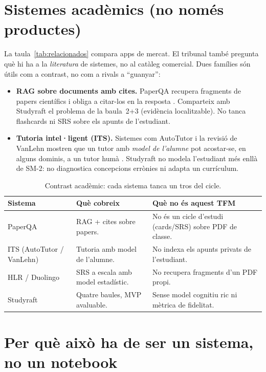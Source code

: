 \section{Sistemes acadèmics (no només productes)}

La taula~\ref{tab:relacionados} compara apps de mercat. El tribunal també pregunta què hi ha a la \emph{literatura} de sistemes, no al catàleg comercial. Dues famílies són útils com a contrast, no com a rivals a ``guanyar'':

\begin{itemize}
  \item \textbf{RAG sobre documents amb cites.} PaperQA recupera fragments de papers científics i obliga a citar-los en la resposta \parencite{lala2023paperqa}. Comparteix amb Studyraft el problema de la baula~2+3 (evidència localitzable). No tanca flashcards ni SRS sobre els apunts de l'estudiant.
  \item \textbf{Tutoria intel·ligent (ITS).} Sistemes com AutoTutor i la revisió de VanLehn mostren que un tutor amb \emph{model de l'alumne} pot acostar-se, en alguns dominis, a un tutor humà \parencite{graesser2005autotutor,vanlehn2011tutoring}. Studyraft no modela l'estudiant més enllà de SM-2: no diagnostica concepcions errònies ni adapta un currículum.
\end{itemize}

\begin{table}[htbp]
\centering
\caption{Contrast acadèmic: cada sistema tanca un tros del cicle.}
\label{tab:academics}
\small
\begin{tabularx}{\textwidth}{lXX}
\toprule
Sistema & Què cobreix & Què no és aquest TFM \\
\midrule
PaperQA & RAG + cites sobre papers. & No és un cicle d'estudi (cards/SRS) sobre PDF de classe. \\
ITS (AutoTutor / VanLehn) & Tutoria amb model de l'alumne. & No indexa els apunts privats de l'estudiant. \\
HLR / Duolingo & SRS a escala amb model estadístic. & No recupera fragments d'un PDF propi. \\
Studyraft & Quatre baules, MVP avaluable. & Sense model cognitiu ric ni mètrica de fidelitat. \\
\bottomrule
\end{tabularx}
\end{table}

\section{Per què això ha de ser un sistema, no un notebook}

